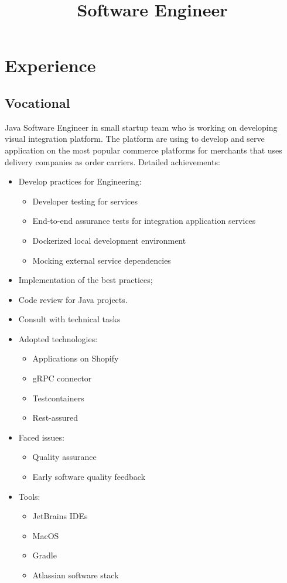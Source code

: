 \documentclass[11pt, a4paper]{moderncv}
\title{Software Engineer}
\begin{document}
\makecvtitle

\section{Experience}
\subsection{Vocational}

{
Java Software Engineer in small startup team who is working on developing visual integration platform. The platform are using to develop and serve application on the most popular commerce platforms for merchants that uses delivery companies as order carriers.
\newline{}
Detailed achievements:
\begin{itemize}
\item Develop practices for Engineering:
\begin{itemize}
\item Developer testing for services
\item End-to-end assurance tests for integration application services
\item Dockerized local development environment
\item Mocking external service dependencies
\end{itemize}
\item Implementation of the best practices;
\item Code review for Java projects.
\item Consult with technical tasks
\item Adopted technologies:
\begin{itemize}
\item Applications on Shopify
\item gRPC connector
\item Testcontainers
\item Rest-assured
\end{itemize}
\item Faced issues:
\begin{itemize}
\item Quality assurance
\item Early software quality feedback
\end{itemize}
\item Tools:
\begin{itemize}
\item JetBrains IDEs
\item MacOS
\item Gradle
\item Atlassian software stack
\end{itemize}
\end{itemize}
}
\end{document}
